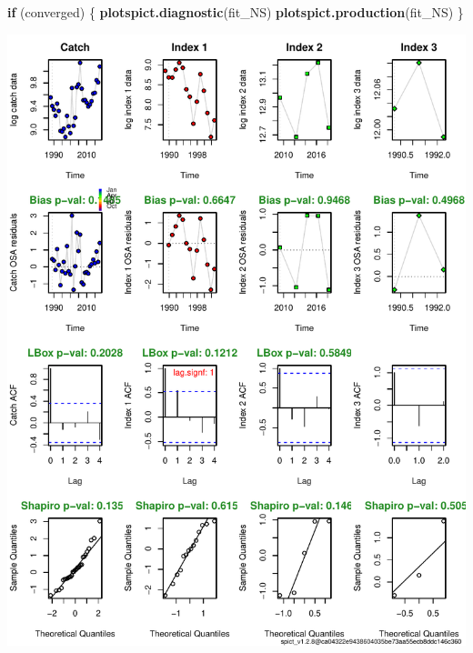 \documentclass[
]{article}
\newenvironment{Shaded}{\begin{snugshade}}{\end{snugshade}}
\newcommand{\ControlFlowTok}[1]{\textcolor[rgb]{0.13,0.29,0.53}{\textbf{#1}}}
\newcommand{\KeywordTok}[1]{\textcolor[rgb]{0.13,0.29,0.53}{\textbf{#1}}}
\newcommand{\NormalTok}[1]{#1}
\begin{document}
\begin{Shaded}
\begin{Highlighting}[]
\ControlFlowTok{if}\NormalTok{ (converged) \{}
  \KeywordTok{plotspict.diagnostic}\NormalTok{(fit_NS)}
  \KeywordTok{plotspict.production}\NormalTok{(fit_NS)}
\NormalTok{\}}
\end{Highlighting}
\end{Shaded}

\includegraphics{aru.27.123a4_SPiCT_WD_files/figure-latex/diagnostics_scenario_5-1.pdf}
\end{document}
